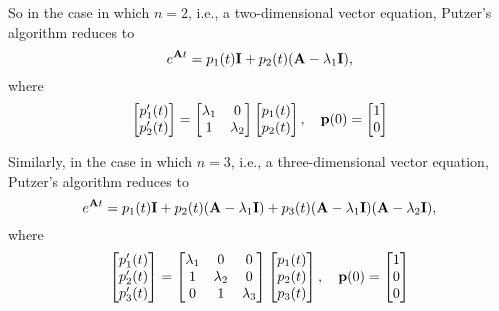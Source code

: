 \bigskip

So in the case in which \(n = 2\), i.e., a two-dimensional vector equation,
Putzer's algorithm reduces to
\[e^{\mathbf{A} t} = p_1(t) \mathbf{I} + p_2(t) (\mathbf{A} - \lambda_1 \mathbf{I}),\]
where
\[\begin{bmatrix}
        p'_1(t) \\
        p'_2(t)
    \end{bmatrix} =
    \begin{bmatrix}
        \lambda_1 & 0         \\
        1         & \lambda_2
    \end{bmatrix}
    \begin{bmatrix}
        p_1(t) \\
        p_2(t)
    \end{bmatrix},
    \quad
    \mathbf{p}(0) = \begin{bmatrix}
        1 \\ 0
    \end{bmatrix}
\]

Similarly, in the case in which \(n = 3\), i.e., a three-dimensional vector equation, Putzer's algorithm reduces to
\[e^{\mathbf{A} t} = p_1(t) \mathbf{I} + p_2(t) (\mathbf{A} - \lambda_1 \mathbf{I}) + p_3(t)(\mathbf{A} - \lambda_1 \mathbf{I})(\mathbf{A} - \lambda_2 \mathbf{I}),\]
where
\[\begin{bmatrix}
        p'_1(t) \\
        p'_2(t) \\
        p'_3(t)
    \end{bmatrix} =
    \begin{bmatrix}
        \lambda_1 & 0         & 0         \\
        1         & \lambda_2 & 0         \\
        0         & 1         & \lambda_3
    \end{bmatrix}
    \begin{bmatrix}
        p_1(t) \\
        p_2(t) \\
        p_3(t)
    \end{bmatrix},
    \quad
    \mathbf{p}(0) = \begin{bmatrix}
        1 \\ 0 \\ 0
    \end{bmatrix}
\]